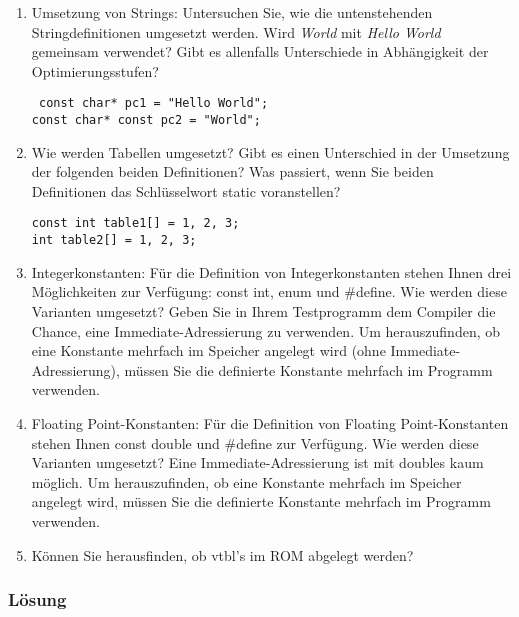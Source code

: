 \begin{enumerate}
  \item  Umsetzung von Strings: Untersuchen Sie, wie die untenstehenden Stringdefinitionen umgesetzt werden.
Wird \textit{World} mit \textit{Hello World} gemeinsam verwendet? Gibt es allenfalls Unterschiede in Abhängigkeit
der Optimierungsstufen?

\texttt{
const char* pc1 = "Hello World";\\
const char* const pc2 = "World";}

\item Wie werden Tabellen umgesetzt? Gibt es einen Unterschied in der Umsetzung der folgenden beiden Definitionen?
Was passiert, wenn Sie beiden Definitionen das Schlüsselwort static voranstellen?

\texttt{const int table1[] = {1, 2, 3};\\
int table2[] = {1, 2, 3};}

\item Integerkonstanten: Für die Definition von Integerkonstanten stehen Ihnen drei Möglichkeiten zur Verfügung:
const int, enum und \#define. Wie werden diese Varianten umgesetzt? Geben Sie in Ihrem
Testprogramm dem Compiler die Chance, eine Immediate-Adressierung zu verwenden. Um herauszufinden,
ob eine Konstante mehrfach im Speicher angelegt wird (ohne Immediate-Adressierung), müssen
Sie die definierte Konstante mehrfach im Programm verwenden.
\item Floating Point-Konstanten: Für die Definition von Floating Point-Konstanten stehen Ihnen const double
und \#define zur Verfügung. Wie werden diese Varianten umgesetzt? Eine Immediate-Adressierung ist
mit doubles kaum möglich. Um herauszufinden, ob eine Konstante mehrfach im Speicher angelegt wird,
müssen Sie die definierte Konstante mehrfach im Programm verwenden.
\item Können Sie herausfinden, ob vtbl's im ROM abgelegt werden?
\end{enumerate}

\subsubsection{Lösung}

